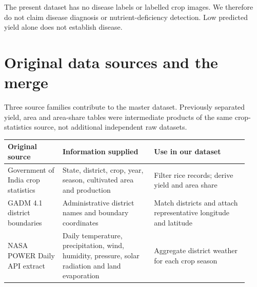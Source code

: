 \documentclass[11pt,a4paper]{article}
\begin{document}
The present dataset has no disease labels or labelled crop images. We therefore do not claim disease diagnosis or nutrient-deficiency detection. Low predicted yield alone does not establish disease.

\clearpage\section*{Original data sources and the merge}
Three source families contribute to the master dataset. Previously separated yield, area and area-share tables were intermediate products of the same crop-statistics source, not additional independent raw datasets.

{\small\renewcommand{\arraystretch}{1.22}\setlength{\tabcolsep}{4pt}\begin{tabular}{>{\raggedright\arraybackslash}p{0.2126\linewidth}>{\raggedright\arraybackslash}p{0.3521\linewidth}>{\raggedright\arraybackslash}p{0.3654\linewidth}}\toprule
\textbf{Original source} & \textbf{Information supplied} & \textbf{Use in our dataset}\\\midrule
Government of India crop statistics & State, district, crop, year, season, cultivated area and production & Filter rice records; derive yield and area share\\[3pt]
GADM 4.1 district boundaries & Administrative district names and boundary coordinates & Match districts and attach representative longitude and latitude\\[3pt]
NASA POWER Daily API extract & Daily temperature, precipitation, wind, humidity, pressure, solar radiation and land evaporation & Aggregate district weather for each crop season\\[3pt]
\bottomrule\end{tabular}}\par
\end{document}
